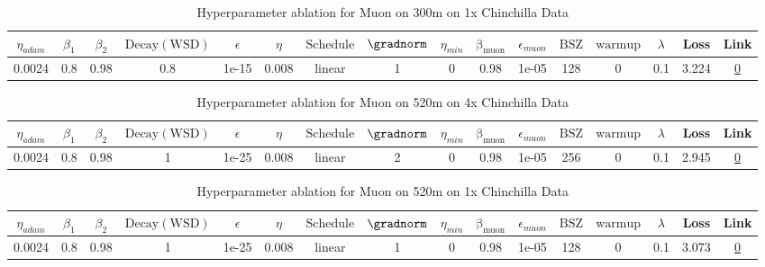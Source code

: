 \begin{table}[H]
\centering
\caption{Hyperparameter ablation for Muon on 300m on 1x Chinchilla Data}
\label{tab:ablation_muon_300m_1}
\begin{tabular}{cccccccccccccccc}
\toprule
$\eta_{adam}$ & $\beta_1$ & $\beta_2$ & $\mathrm{Decay (WSD)}$ & $\epsilon$ & $\eta$ & $\mathrm{Schedule}$ & $\gradnorm$ & $\eta_{min}$ & $\mathrm{\beta_{muon}}$ & $\epsilon_{muon}$ & $\mathrm{BSZ}$ & $\mathrm{warmup}$ & $\lambda$ & Loss & Link \\
\midrule
0.0024 & 0.8 & 0.98 & 0.8 & 1e-15 & 0.008 & linear & 1 & 0 & 0.98 & 1e-05 & 128 & 0 & 0.1 & 3.224 & \href{https://wandb.ai/stanford-mercury/optimizer-scaling/runs/sweep-300m-6B-muon103aa7lr0.008-wd0.1-minlr0-warmup0-b10.8-b20.9-299b18}{0} \\
\midrule
\bottomrule
\end{tabular}
\end{table}

\begin{table}[H]
\centering
\caption{Hyperparameter ablation for Muon on 520m on 4x Chinchilla Data}
\label{tab:ablation_muon_520m_4}
\begin{tabular}{cccccccccccccccc}
\toprule
$\eta_{adam}$ & $\beta_1$ & $\beta_2$ & $\mathrm{Decay (WSD)}$ & $\epsilon$ & $\eta$ & $\mathrm{Schedule}$ & $\gradnorm$ & $\eta_{min}$ & $\mathrm{\beta_{muon}}$ & $\epsilon_{muon}$ & $\mathrm{BSZ}$ & $\mathrm{warmup}$ & $\lambda$ & Loss & Link \\
\midrule
0.0024 & 0.8 & 0.98 & 1 & 1e-25 & 0.008 & linear & 2 & 0 & 0.98 & 1e-05 & 256 & 0 & 0.1 & 2.945 & \href{https://wandb.ai/stanford-mercury/optimizer-scaling/runs/sweep-520m-42B-muon92eab1lr0.008-wd0.1-minlr0-warmup0-b10.8-b20.-f2fd04}{0} \\
\midrule
\bottomrule
\end{tabular}
\end{table}

\begin{table}[H]
\centering
\caption{Hyperparameter ablation for Muon on 520m on 1x Chinchilla Data}
\label{tab:ablation_muon_520m_1}
\begin{tabular}{cccccccccccccccc}
\toprule
$\eta_{adam}$ & $\beta_1$ & $\beta_2$ & $\mathrm{Decay (WSD)}$ & $\epsilon$ & $\eta$ & $\mathrm{Schedule}$ & $\gradnorm$ & $\eta_{min}$ & $\mathrm{\beta_{muon}}$ & $\epsilon_{muon}$ & $\mathrm{BSZ}$ & $\mathrm{warmup}$ & $\lambda$ & Loss & Link \\
\midrule
0.0024 & 0.8 & 0.98 & 1 & 1e-25 & 0.008 & linear & 1 & 0 & 0.98 & 1e-05 & 128 & 0 & 0.1 & 3.073 & \href{https://wandb.ai/stanford-mercury/optimizer-scaling/runs/sweep-520m-10B-muonb6462flr0.008-wd0.1-minlr0-warmup0-b10.8-b20.-bb54fc}{0} \\
\midrule
\bottomrule
\end{tabular}
\end{table}

